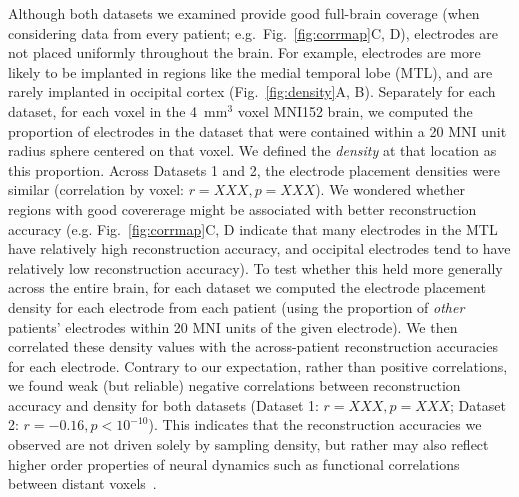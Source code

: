 \message{ !name(main.tex)}\documentclass[11pt]{article}
\begin{document}
{Although both datasets we examined provide good full-brain coverage
(when considering data from every patient; e.g.\
Fig.~\ref{fig:corrmap}C, D), electrodes are not placed uniformly
throughout the brain.  For example, electrodes are more likely to be
implanted in regions like the medial temporal lobe (MTL), and are
rarely implanted in occipital cortex (Fig.~\ref{fig:density}A, B).
Separately for each dataset, for each voxel in the 4~mm$^3$ voxel
MNI152 brain, we computed the proportion of electrodes in the dataset
that were contained within a 20 MNI unit radius sphere centered on
that voxel.  We defined the \textit{density} at that location as this
proportion.  Across Datasets 1 and 2, the electrode placement
densities were similar (correlation by voxel:
$r = XXX, p = XXX$).  We wondered whether regions with good
covererage might be associated with better reconstruction accuracy
(e.g. Fig.~\ref{fig:corrmap}C, D indicate that many electrodes in the
MTL have relatively high reconstruction accuracy, and occipital
electrodes tend to have relatively low reconstruction accuracy).  To
test whether this held more generally across the entire brain, for
each dataset we computed the electrode placement density for each
electrode from each patient (using the proportion of \textit{other}
patients' electrodes within 20 MNI units of the given electrode).  We
then correlated these density values with the across-patient
reconstruction accuracies for each electrode.  Contrary to our
expectation, rather than positive correlations, we found weak (but
reliable) negative correlations between reconstruction accuracy and
density for both datasets (Dataset 1: $r = XXX, p = XXX$; Dataset 2:
$r = -0.16, p < 10^{-10}$).  This indicates that the reconstruction
accuracies we observed are not driven solely by sampling density, but
rather may also reflect higher order properties of neural dynamics
such as functional correlations between distant
voxels~\citep{BetzEtal17b}.

}
\end{document}
